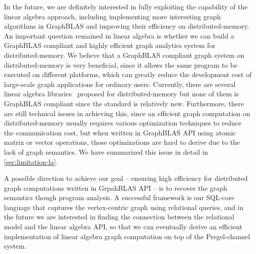 \documentclass{sokendai_thesis} %
\begin{document}
In the future, we are definitely interested in fully exploiting the capability of the linear algebra approach, including implementing more interesting graph algorithms in GraphBLAS and improving their efficiency on distributed-memory.
An important question remained in linear algebra is whether we can build a GraphBLAS compliant and highly efficient graph analytics system for distributed-memory.
We believe that a GraphBLAS compliant graph system on distributed-memory is very beneficial, since it allows the same program to be executed on different platforms, which can greatly reduce the development cost of large-scale graph applications for ordinary users.
Currently, there are several linear algebra libraries~\cite{pegasus,combblas,graphmat} proposed for distributed-memory but none of them is GraphBLAS compliant since the standard is relatively new.
Furthermore, there are still technical issues in achieving this, since an efficient graph computation on distributed-memory usually requires various optimization techniques to reduce the communication cost, but when written in GraphBLAS API using atomic matrix or vector operations, those optimizations are hard to derive due to the lack of graph semantics.
We have summarized this issue in detail in \autoref{sec:limitation-la}.

A possible direction to achieve our goal -- ensuring high efficiency for distributed graph computations written in GrpahBLAS API -- is to recover the graph semantics though program analysis.
A successful framework is our SQL-core language that captures the vertex-centric graph using relational queries, and in the future we are interested in finding the connection between the relational model and the linear algebra API, so that we can eventually derive an efficient implementation of linear algebra graph computation on top of the Pregel-channel system.
\end{document}
